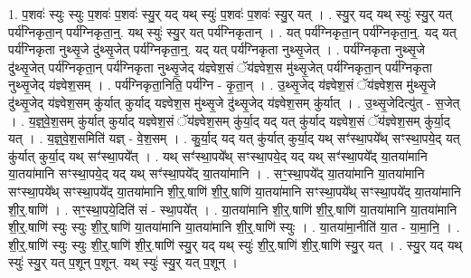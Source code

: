 \documentclass[17pt]{extarticle}
\begin{document}
1. प॒शवः॑ स्युः स्युः प॒शवः॑ प॒शवः॑ स्यु॒र् यद् यथ् स्युः॑ प॒शवः॑ प॒शवः॑ स्यु॒र् यत् । . स्यु॒र् यद् यथ् स्युः॑ स्यु॒र् यत् पर्य॑ग्निकृता॒न् पर्य॑ग्निकृता॒न्॒. यथ् स्युः॑ स्यु॒र् यत् पर्य॑ग्निकृतान् । . यत् पर्य॑ग्निकृता॒न् पर्य॑ग्निकृता॒न्॒. यद् यत् पर्य॑ग्निकृता नुथ्सृ॒जे दु॑थ्सृ॒जेत् पर्य॑ग्निकृता॒न्॒. यद् यत् पर्य॑ग्निकृता नुथ्सृ॒जेत् । . पर्य॑ग्निकृता नुथ्सृ॒जे दु॑थ्सृ॒जेत् पर्य॑ग्निकृता॒न् पर्य॑ग्निकृता नुथ्सृ॒जेद् य॑ज्ञ्वेश॒सं ॅय॑ज्ञ्वेश॒स मु॑थ्सृ॒जेत् पर्य॑ग्निकृता॒न् पर्य॑ग्निकृता नुथ्सृ॒जेद् य॑ज्ञ्वेश॒सम् । . पर्य॑ग्निकृता॒निति॒ पर्य॑ग्नि - कृ॒ता॒न् । . उ॒थ्सृ॒जेद् य॑ज्ञ्वेश॒सं ॅय॑ज्ञ्वेश॒स मु॑थ्सृ॒जे दु॑थ्सृ॒जेद् य॑ज्ञ्वेश॒सम् कु॑र्यात् कुर्याद् यज्ञ्वेश॒स मु॑थ्सृ॒जे दु॑थ्सृ॒जेद् य॑ज्ञ्वेश॒सम् कु॑र्यात् । . उ॒थ्सृ॒जेदित्यु॑त् - स॒जेत् । . य॒ज्ञ्॒वे॒श॒सम् कु॑र्यात् कुर्याद् यज्ञ्वेश॒सं ॅय॑ज्ञ्वेश॒सम् कु॑र्या॒द् यद् यत् कु॑र्याद् यज्ञ्वेश॒सं ॅय॑ज्ञ्वेश॒सम् कु॑र्या॒द् यत् । . य॒ज्ञ्॒वे॒श॒समिति॑ यज्ञ् - वे॒श॒सम् । . कु॒र्या॒द् यद् यत् कु॑र्यात् कुर्या॒द् यथ् सꣳ॑स्था॒पये᳚थ् सꣳस्था॒पये॒द् यत् कु॑र्यात् कुर्या॒द् यथ् सꣳ॑स्था॒पये᳚त् । . यथ् सꣳ॑स्था॒पये᳚थ् सꣳस्था॒पये॒द् यद् यथ् सꣳ॑स्था॒पये᳚द् या॒तया॑मानि या॒तया॑मानि सꣳस्था॒पये॒द् यद् यथ् सꣳ॑स्था॒पये᳚द् या॒तया॑मानि । . सꣳ॒॒स्था॒पये᳚द् या॒तया॑मानि या॒तया॑मानि सꣳस्था॒पये᳚थ् सꣳस्था॒पये᳚द् या॒तया॑मानि शी॒र्॒.षाणि॑ शी॒र्॒.षाणि॑ या॒तया॑मानि सꣳस्था॒पये᳚थ् सꣳस्था॒पये᳚द् या॒तया॑मानि शी॒र्॒.षाणि॑ । . सꣳ॒॒स्था॒पये॒दिति॑ सं - स्था॒पये᳚त् । . या॒तया॑मानि शी॒र्॒.षाणि॑ शी॒र्॒.षाणि॑ या॒तया॑मानि या॒तया॑मानि शी॒र्॒.षाणि॑ स्युः स्युः शी॒र्॒.षाणि॑ या॒तया॑मानि या॒तया॑मानि शी॒र्॒.षाणि॑ स्युः । . या॒तया॑मा॒नीति॑ या॒त - या॒मा॒नि॒ । . शी॒र्॒.षाणि॑ स्युः स्युः शी॒र्॒.षाणि॑ शी॒र्॒.षाणि॑ स्यु॒र् यद् यथ् स्युः॑ शी॒र्॒.षाणि॑ शी॒र्॒.षाणि॑ स्यु॒र् यत् । . स्यु॒र् यद् यथ् स्युः॑ स्यु॒र् यत् प॒शून् प॒शून्. यथ् स्युः॑ स्यु॒र् यत् प॒शून् । \newline
\end{document}
